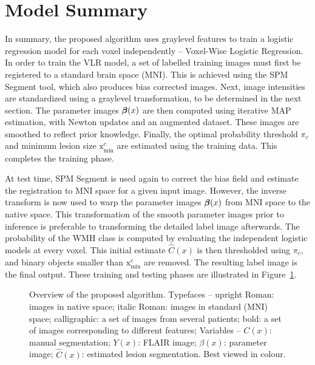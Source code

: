 \section{Model Summary}
In summary, the proposed algorithm uses graylevel features
to train a logistic regression model for each voxel independently -- Voxel-Wise Logistic Regression.
In order to train the VLR model,
a set of labelled training images must first be registered to a standard brain space (MNI).
This is achieved using the SPM Segment tool, which also produces bias corrected images.
Next, image intensities are standardized using a graylevel transformation,
to be determined in the next section.
The parameter images $\bm{\beta}(x)$ are then computed using iterative MAP estimation,
with Newton updates and an augmented dataset.
These images are smoothed to reflect prior knowledge.
Finally, the optimal probability threshold $\pi_c$ and  minimum lesion size $\mathrm{x}_{\min}^{c}$
are estimated using the training data.
This completes the training phase.
\par
At test time, SPM Segment is used again to
correct the bias field and estimate the registration to MNI space for a given input image.
However, the inverse transform is now used to warp the parameter images $\bm{\beta}(x)$
from MNI space to the native space.
This transformation of the smooth parameter images prior to inference is preferable
to transforming the detailed label image afterwards.
The probability of the WMH class is computed
by evaluating the independent logistic models at every voxel.
This initial estimate $\hat{C}(x)$ is then thresholded using $\pi_c$,
and binary objects smaller than $\mathrm{x}_{\min}^{c}$ are removed.
The resulting label image is the final output.
These training and testing phases are illustrated in Figure~\ref{fig:modelsum}.
\begin{figure}
  \centering\scalebox{0.65}{}
  \caption{Overview of the proposed algorithm.
    Typefaces --
    upright Roman: images in native space;
    italic Roman: images in standard (MNI) space;
    calligraphic: a set of images from several patients;
    bold: a set of images corresponding to different features;
    Variables --
    $C(x)$: manual segmentation;
    $Y(x)$: FLAIR image;
    $\beta(x)$: parameter image;
    $\hat{C}(x)$: estimated lesion segmentation.
    Best viewed in colour.}%
  \label{fig:modelsum}
\end{figure}
